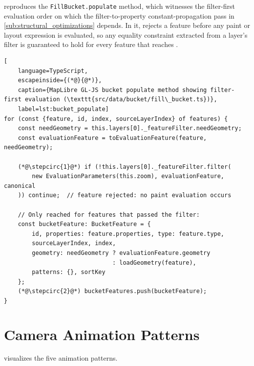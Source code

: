  reproduces the \texttt{FillBucket.populate} method, which witnesses the filter-first evaluation order on which the filter-to-property constant-propagation pass in \cref{sub:structural_optimizations} depends.
In it,  rejects a feature before any paint or layout expression is evaluated, so any equality constraint extracted from a layer's filter is guaranteed to hold for every feature that reaches .

\begin{lstlisting}[
	language=TypeScript,
	escapeinside={(*@}{@*)},
	caption={MapLibre GL-JS bucket populate method showing filter-first evaluation (\texttt{src/data/bucket/fill\_bucket.ts})},
	label=lst:bucket_populate]
for (const {feature, id, index, sourceLayerIndex} of features) {
    const needGeometry = this.layers[0]._featureFilter.needGeometry;
    const evaluationFeature = toEvaluationFeature(feature, needGeometry);

    (*@\stepcirc{1}@*) if (!this.layers[0]._featureFilter.filter(
        new EvaluationParameters(this.zoom), evaluationFeature, canonical
    )) continue;  // feature rejected: no paint evaluation occurs

    // Only reached for features that passed the filter:
    const bucketFeature: BucketFeature = {
        id, properties: feature.properties, type: feature.type,
        sourceLayerIndex, index,
        geometry: needGeometry ? evaluationFeature.geometry
                               : loadGeometry(feature),
        patterns: {}, sortKey
    };
    (*@\stepcirc{2}@*) bucketFeatures.push(bucketFeature);
}
\end{lstlisting}
\clearpage

\section{Camera Animation Patterns}\label{app:animation_patterns}
 visualizes the five animation patterns.

